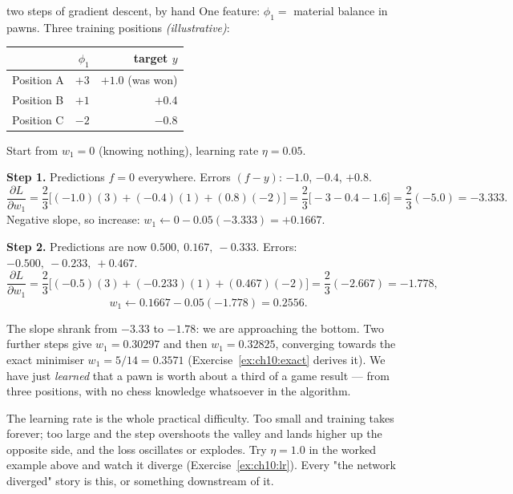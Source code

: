 \begin{worked}{two steps of gradient descent, by hand}
One feature: $\phi_1 =$ material balance in pawns. Three training positions
\emph{(illustrative)}:
\begin{center}
\begin{tabular}{@{}lrr@{}}
\toprule
 & $\phi_1$ & target $y$ \\
\midrule
Position A & $+3$ & $+1.0$ (was won) \\
Position B & $+1$ & $+0.4$ \\
Position C & $-2$ & $-0.8$ \\
\bottomrule
\end{tabular}
\end{center}
Start from $w_1 = 0$ (knowing nothing), learning rate $\eta = 0.05$.

\medskip
\textbf{Step 1.} Predictions $f = 0$ everywhere. Errors $(f - y)$: $-1.0$, $-0.4$, $+0.8$.
\[
\frac{\partial L}{\partial w_1} = \frac{2}{3}\bigl[(-1.0)(3) + (-0.4)(1) + (0.8)(-2)\bigr]
= \frac{2}{3}\bigl[-3 - 0.4 - 1.6\bigr] = \frac{2}{3}(-5.0) = -3.333 .
\]
Negative slope, so increase:
$w_1 \leftarrow 0 - 0.05(-3.333) = +0.1667$.

\medskip
\textbf{Step 2.} Predictions are now $0.500,\ 0.167,\ -0.333$. Errors:
$-0.500,\ -0.233,\ +0.467$.
\[
\frac{\partial L}{\partial w_1} = \frac{2}{3}\bigl[(-0.5)(3) + (-0.233)(1) + (0.467)(-2)\bigr]
= \frac{2}{3}(-2.667) = -1.778 ,
\]
\[
w_1 \leftarrow 0.1667 - 0.05(-1.778) = 0.2556 .
\]

\medskip
The slope shrank from $-3.33$ to $-1.78$: we are approaching the bottom. Two further steps
give $w_1 = 0.30297$ and then $w_1 = 0.32825$, converging towards the exact minimiser
$w_1 = 5/14 = 0.3571$ (Exercise~\ref{ex:ch10:exact} derives it). We have just \emph{learned}
that a pawn is worth about a third of a game result --- from three positions, with no chess
knowledge whatsoever in the algorithm.
\end{worked}

\begin{pitfall}
The learning rate is the whole practical difficulty. Too small and training takes forever; too
large and the step overshoots the valley and lands higher up the opposite side, and the loss
oscillates or explodes. Try $\eta = 1.0$ in the worked example above and watch it diverge
(Exercise~\ref{ex:ch10:lr}). Every "the network diverged" story is this, or something
downstream of it.
\end{pitfall}

